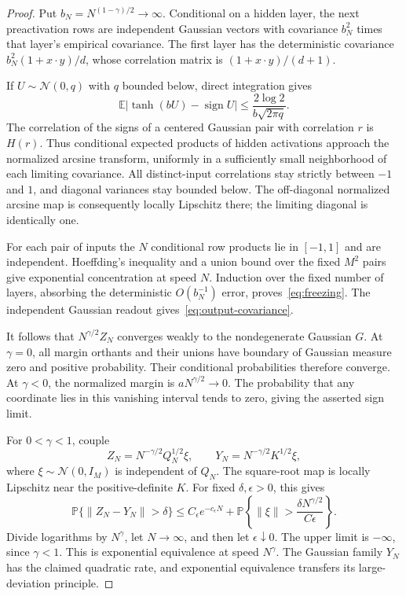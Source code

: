 \documentclass[11pt]{article}
\theoremstyle{remark}
\DeclareMathOperator{\sign}{sign}
\newcommand{\E}{\mathbb E}
\newcommand{\Prb}{\mathbb P}
\begin{document}
\begin{proof}
Put $b_N=N^{(1-\gamma)/2}\to\infty$. Conditional on a hidden
layer, the next preactivation rows are independent Gaussian
vectors with covariance $b_N^2$ times that layer's empirical
covariance. The first layer has the deterministic covariance
$b_N^2(1+x\cdot y)/d$, whose correlation matrix is
$(1+x\cdot y)/(d+1)$.

If $U\sim\mathcal N(0,q)$ with $q$ bounded below, direct integration
gives
\[
 \E|\tanh(bU)-\sign U|
 \le \frac{2\log2}{b\sqrt{2\pi q}}.
\]
The correlation of the signs of a centered Gaussian pair with
correlation $r$ is $H(r)$. Thus conditional expected products of
hidden activations approach the normalized arcsine transform,
uniformly in a sufficiently small neighborhood of each limiting
covariance. All distinct-input correlations stay strictly between
$-1$ and $1$, and diagonal variances stay bounded below. The
off-diagonal normalized arcsine map is consequently locally
Lipschitz there; the limiting diagonal is identically one.

For each pair of inputs the $N$ conditional row products lie in
$[-1,1]$ and are independent. Hoeffding's inequality and a union
bound over the fixed $M^2$ pairs give exponential concentration
at speed $N$. Induction over the fixed number of layers, absorbing
the deterministic $O(b_N^{-1})$ error, proves~\eqref{eq:freezing}.
The independent Gaussian readout gives~\eqref{eq:output-covariance}.

It follows that $N^{\gamma/2}Z_N$ converges weakly to the
nondegenerate Gaussian $G$. At $\gamma=0$, all margin orthants and
their unions have boundary of Gaussian measure zero and positive
probability. Their conditional probabilities therefore converge.
At $\gamma<0$, the normalized margin is
$aN^{\gamma/2}\to0$. The probability that any coordinate lies in
this vanishing interval tends to zero, giving the asserted sign
limit.

For $0<\gamma<1$, couple
\[
 Z_N=N^{-\gamma/2}Q_N^{1/2}\xi,\qquad
 Y_N=N^{-\gamma/2}K^{1/2}\xi,
\]
where $\xi\sim\mathcal N(0,I_M)$ is independent of $Q_N$.
The square-root map is locally Lipschitz near the positive-definite
$K$. For fixed $\delta,\epsilon>0$, this gives
\[
 \Prb\{\|Z_N-Y_N\|>\delta\}
 \le C_\epsilon e^{-c_\epsilon N}
   +\Prb\left\{\|\xi\|>
             \frac{\delta N^{\gamma/2}}{C\epsilon}\right\}.
\]
Divide logarithms by $N^\gamma$, let $N\to\infty$, and then let
$\epsilon\downarrow0$. The upper limit is $-\infty$, since
$\gamma<1$. This is exponential equivalence at speed $N^\gamma$.
The Gaussian family $Y_N$ has the claimed quadratic rate, and
exponential equivalence transfers its large-deviation principle.
\end{proof}
\end{document}
